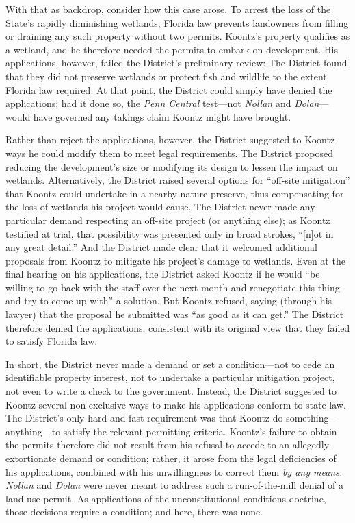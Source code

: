 With that as backdrop, consider how this case arose. To arrest the loss of the
State's rapidly diminishing wetlands, Florida law prevents landowners from
filling or draining any such property without two permits. Koontz's property
qualifies as a wetland, and he therefore needed the permits to embark on
development. His applications, however, failed the District's preliminary
review: The District found that they did not preserve wetlands or protect fish
and wildlife to the extent Florida law required. At that point, the District
could simply have denied the applications; had it done so, the \textit{Penn
Central} test---not \textit{Nollan} and \textit{Dolan}---would have governed any
takings claim Koontz might have brought. 

Rather than reject the applications, however, the District suggested to Koontz
ways he could modify them to meet legal requirements. The District proposed
reducing the development's size or modifying its design to lessen the impact on
wetlands. Alternatively, the District raised several options for ``off-site
mitigation'' that Koontz could undertake in a nearby nature preserve, thus
compensating for the loss of wetlands his project would cause. The District
never made any particular demand respecting an off-site project (or anything
else); as Koontz testified at trial, that possibility was presented only in
broad strokes, ``[n]ot in any great detail.'' And the District made clear that
it welcomed additional proposals from Koontz to mitigate his project's damage to
wetlands. Even at the final hearing on his applications, the District asked
Koontz if he would ``be willing to go back with the staff over the next month
and renegotiate this thing and try to come up with'' a solution. But Koontz
refused, saying (through his lawyer) that the proposal he submitted was ``as
good as it can get.'' The District therefore denied the applications, consistent
with its original view that they failed to satisfy Florida law.

In short, the District never made a demand or set a condition---not to cede an
identifiable property interest, not to undertake a particular mitigation
project, not even to write a check to the government. Instead, the District
suggested to Koontz several non-exclusive ways to make his applications conform
to state law. The District's only hard-and-fast requirement was that Koontz do
something---anything---to satisfy the relevant permitting criteria. Koontz's
failure to obtain the permits therefore did not result from his refusal to
accede to an allegedly extortionate demand or condition; rather, it arose from
the legal deficiencies of his applications, combined with his unwillingness to
correct them \textit{by any means.} \textit{Nollan} and \textit{Dolan} were
never meant to address such a run-of-the-mill denial of a land-use permit. As
applications of the unconstitutional conditions doctrine, those decisions
require a condition; and here, there was none.

